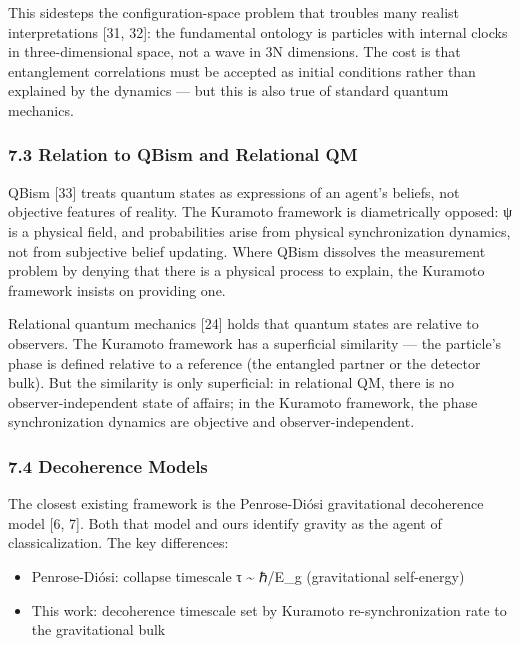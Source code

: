\documentclass[
]{article}
\providecommand{\tightlist}{%
  \setlength{\itemsep}{0pt}\setlength{\parskip}{0pt}}
\begin{document}
This sidesteps the configuration-space problem that troubles many
realist interpretations {[}31, 32{]}: the fundamental ontology is
particles with internal clocks in three-dimensional space, not a wave in
3N dimensions. The cost is that entanglement correlations must be
accepted as initial conditions rather than explained by the dynamics ---
but this is also true of standard quantum mechanics.

\subsubsection{7.3 Relation to QBism and Relational
QM}\label{relation-to-qbism-and-relational-qm}

QBism {[}33{]} treats quantum states as expressions of an agent's
beliefs, not objective features of reality. The Kuramoto framework is
diametrically opposed: ψ is a physical field, and probabilities arise
from physical synchronization dynamics, not from subjective belief
updating. Where QBism dissolves the measurement problem by denying that
there is a physical process to explain, the Kuramoto framework insists
on providing one.

Relational quantum mechanics {[}24{]} holds that quantum states are
relative to observers. The Kuramoto framework has a superficial
similarity --- the particle's phase is defined relative to a reference
(the entangled partner or the detector bulk). But the similarity is only
superficial: in relational QM, there is no observer-independent state of
affairs; in the Kuramoto framework, the phase synchronization dynamics
are objective and observer-independent.

\subsubsection{7.4 Decoherence Models}\label{decoherence-models}

The closest existing framework is the Penrose-Diósi gravitational
decoherence model {[}6, 7{]}. Both that model and ours identify gravity
as the agent of classicalization. The key differences:

\begin{itemize}
\tightlist
\item
  Penrose-Diósi: collapse timescale τ \textasciitilde{} ℏ/E\_g
  (gravitational self-energy)
\item
  This work: decoherence timescale set by Kuramoto re-synchronization
  rate to the gravitational bulk
\end{itemize}
\end{document}
